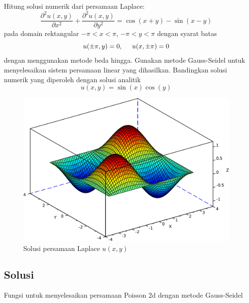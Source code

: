 \documentclass[10pt,bahasa]{article}
\begin{document}
Hitung solusi numerik dari persamaan Laplace:
\begin{equation}
\frac{\partial^2 u(x,y)}{\partial x^2} +
\frac{\partial^2 u(x,y)}{\partial y^2} = \cos(x + y) - \sin(x - y)
\end{equation}
pada domain rektangular $-\pi < x < \pi$, $-\pi < y < \pi$ dengan syarat batas
\begin{equation}
u(\pm\pi,y) = 0, \hspace{0.5cm} u(x,\pm\pi) = 0
\end{equation}
dengan menggunakan metode beda hingga. Gunakan metode Gauss-Seidel untuk
menyelesaikan sistem persamaan linear yang dihasilkan.
Bandingkan solusi numerik yang diperoleh dengan
solusi analitik
\begin{equation}
u(x,y) = \sin(x)\cos(y)
\end{equation}

\begin{figure}[H]
\centering
\includegraphics[scale=0.5]{poisson2d.pdf}
\par
\caption{Solusi persamaan Laplace $u(x,y)$}
\end{figure}

\subsection*{Solusi}

Fungsi untuk menyelesaikan persamaan Poisson 2d dengan metode Gauss-Seidel
\end{document}
